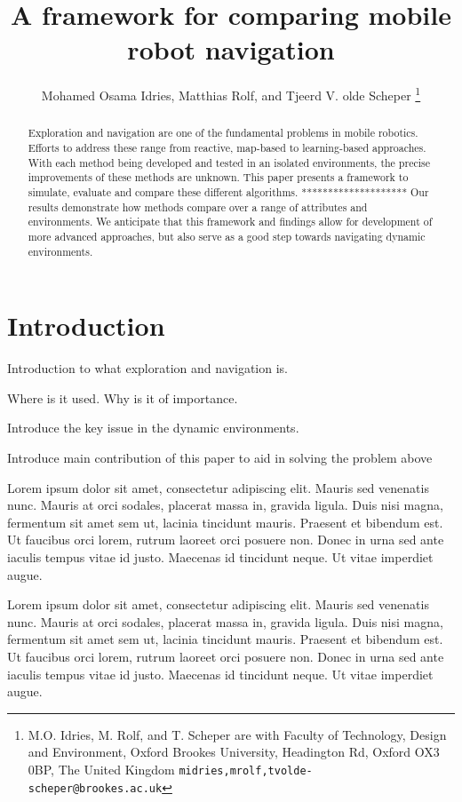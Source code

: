\documentclass[letterpaper, 10 pt, conference]{ieeeconf}  %
\title{\LARGE \bf
A framework for comparing mobile robot navigation
}
\author{Mohamed Osama Idries, Matthias Rolf, and Tjeerd V. olde Scheper%
\thanks{M.O. Idries, M. Rolf, and T. Scheper are with Faculty of Technology, Design and Environment,
        Oxford Brookes University, Headington Rd, Oxford OX3 0BP, The United Kingdom
        {\tt\small {midries,mrolf,tvolde-scheper}@brookes.ac.uk}}%
}
\begin{document}
\maketitle
\thispagestyle{empty}
\pagestyle{empty}


\begin{abstract}
	Exploration and navigation are one of the fundamental problems in mobile robotics. Efforts to address these range from reactive, map-based to learning-based approaches. With each method being developed and tested in an isolated environments, the precise improvements of these methods are unknown. This paper presents a framework to simulate, evaluate and compare these different algorithms.
	********************
	Our results demonstrate how methods compare over a range of attributes and environments. We anticipate that this framework and findings allow for development of more advanced approaches, but also serve as a good step towards navigating dynamic environments. 
	
\end{abstract}


\section{Introduction}

Introduction to what exploration and navigation is.
 
Where is it used. Why is it of importance.

Introduce the key issue in the dynamic environments.

Introduce main contribution of this paper to aid in solving the problem above

Lorem ipsum dolor sit amet, consectetur adipiscing elit. Mauris sed venenatis nunc. Mauris at orci sodales, placerat massa in, gravida ligula. Duis nisi magna, fermentum sit amet sem ut, lacinia tincidunt mauris. Praesent et bibendum est. Ut faucibus orci lorem, rutrum laoreet orci posuere non. Donec in urna sed ante iaculis tempus vitae id justo. Maecenas id tincidunt neque. Ut vitae imperdiet augue.

Lorem ipsum dolor sit amet, consectetur adipiscing elit. Mauris sed venenatis nunc. Mauris at orci sodales, placerat massa in, gravida ligula. Duis nisi magna, fermentum sit amet sem ut, lacinia tincidunt mauris. Praesent et bibendum est. Ut faucibus orci lorem, rutrum laoreet orci posuere non. Donec in urna sed ante iaculis tempus vitae id justo. Maecenas id tincidunt neque. Ut vitae imperdiet augue.
\end{document}
